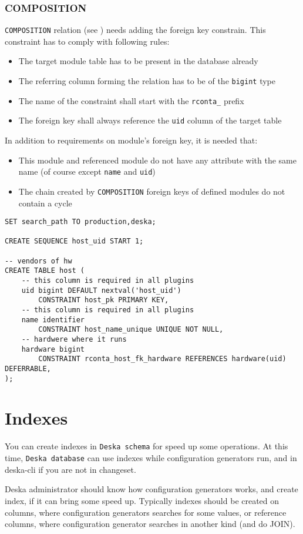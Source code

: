 \documentclass[deska]{subfiles}
\begin{document}
\subsubsection{COMPOSITION}
{\tt COMPOSITION} relation (see ) needs adding the foreign key constrain. This constraint has to comply with following rules:
\begin{itemize}
    \item The target module table has to be present in the database already
    \item The referring column forming the relation has to be of the {\tt bigint} type
    \item The name of the constraint shall start with the {\tt rconta\_} prefix
    \item The foreign key shall always reference the {\tt uid} column of the target table
\end{itemize}
In addition to requirements on module's foreign key, it is needed that:
\begin{itemize}
    \item This module and referenced module do not have any attribute with the same name (of course except {\tt name} and {\tt uid})
    \item The chain created by {\tt COMPOSITION} foreign keys of defined modules do not contain a cycle
\end{itemize}

\begin{verbatim}
SET search_path TO production,deska;

CREATE SEQUENCE host_uid START 1;

-- vendors of hw
CREATE TABLE host (
    -- this column is required in all plugins
    uid bigint DEFAULT nextval('host_uid')
        CONSTRAINT host_pk PRIMARY KEY,
    -- this column is required in all plugins
    name identifier
        CONSTRAINT host_name_unique UNIQUE NOT NULL,
    -- hardwere where it runs
    hardware bigint
        CONSTRAINT rconta_host_fk_hardware REFERENCES hardware(uid) DEFERRABLE,
);
\end{verbatim}

\section{Indexes}
You can create indexes in {\tt Deska schema} for speed up some operations.
At this time, {\tt Deska database} can use indexes while configuration generators run,
and in deska-cli if you are not in changeset.

Deska administrator should know how configuration generators works, and create index, if
it can bring some speed up. Typically indexes should be created on columns, where 
configuration generators searches for some values, or reference columns, where configuration generator
searches in another kind (and do JOIN).
\end{document}
